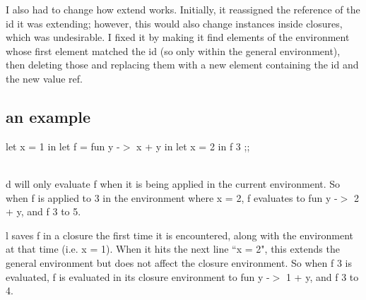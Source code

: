 \documentclass{article}
\begin{document}
I also had to change how extend works. Initially, it reassigned the reference of the id it was extending; however, this would also change instances inside closures, which was undesirable. I fixed it by making it find elements of the environment whose first element matched the id (so only within the general environment), then deleting those and replacing them with a new element containing the id and the new value ref.

\subsection{an example}

\begin{center}
let x = 1 in
let f = fun y -$>$ x + y in
let x = 2 in
f 3 ;;\end{center}
\\


d will only evaluate f when it is being applied in the current environment. So when f is applied to 3 in the environment where x = 2, f evaluates to fun y -$>$ 2 + y, and f 3 to 5. 

l saves f in a closure the first time it is encountered, along with the environment at that time (i.e. x = 1). When it hits the next line ``x = 2", this extends the general environment but does not affect the closure environment. So when f 3 is evaluated, f is evaluated in its closure environment to fun y -$>$ 1 + y, and f 3 to 4.
\end{document}
